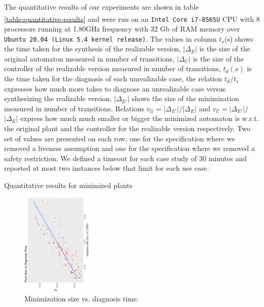 The quantitative results of our experiments are shown in table 
\ref{table:quantitative-results} and were run on an 
\texttt{Intel\textsuperscript{\textregistered} Core\textsuperscript{\texttrademark}
 i7-8565U} CPU with 8 processors running at 1.80GHz frequency
with 32 Gb of RAM memory over \texttt{Ubuntu 20.04 (Linux 5.4 kernel release)}.
 The values in column $t_{s}$(s) shows the time taken for the synthesis of the realizable version, $|\Delta_E|$ is the size of the original automaton measured in number of transitions, $|\Delta_C|$ is the size of the controller of the realizable version measured in number of transitions, $t_{d}(s)$ is the time taken for the diagnosis of each unrealizable case, the relation $t_{d}/t_{s}$ expresses how much more takes to diagnose an unrealizable case versus synthesizing the realizable version, $|\Delta_{E'}|$ shows the size of the  minimization measured in number of transitions. Relations $v_{\mathcal{U}}$$=$$|\Delta_{E'}|$$/$$|\Delta_{E}|$ and $v_{\mathcal{C}}$$=$$|\Delta_{E'}|$$/$$|\Delta_{E}|$ express how much much smaller or bigger the minimized automaton is w.r.t. the original plant and the controller for the realizable version respectively. Two set of values are presented on each row, one for the specification where we removed a liveness assumption and one for the specification where we removed a safety restriction.
We defined a timeout for each case study of 30 minutes and reported at most two instances below that limit for each use case.
\begin{table}
	\resizebox{\textwidth}{!} {

}
  \caption{Quantitative results for minimized plants}
  \label{table:quantitative-results}
 \end{table}
\begin{figure}[bt]
	\centering
	\SmallPicture
	\includegraphics[width=0.3\textwidth, angle=-90]{../experimental_setting/tmp_results/size_vs_diag_time.ps}
	\vspace*{-2mm}
	\caption{Minimization size vs. diagnosis time.}
	\label{fig:size_vs_diag_time}
	\vspace*{-4mm}
	\MediumPicture
\end{figure}
